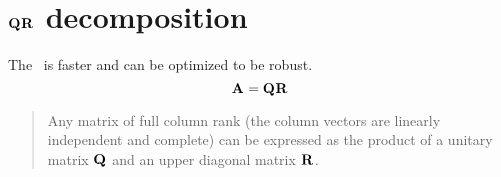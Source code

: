 \section[$\A{}=\Q{}\R{}$]{$\textbf{Q}^{\mathrm{}}\textbf{R}^{\mathrm{}}$ decomposition}

The \qr \ is faster and can be optimized to be robust.
\begin{equation}
  \textbf{A}^{\mathrm{}}=\textbf{Q}^{\mathrm{}}\textbf{R}^{\mathrm{}}
\end{equation}

\begin{quote}
 Any matrix of full column rank (the column vectors are linearly independent and complete) can be expressed as the product of a unitary matrix $\textbf{Q}^{\mathrm{}}$ and an upper diagonal matrix $\textbf{R}^{\mathrm{}}$.
\end{quote}

\endinput